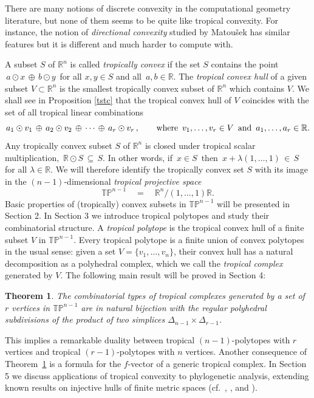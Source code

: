 \documentclass[11pt]{amsart}
\newtheorem{thm}{Theorem}
\newcommand{\RR}{\mathbb{R}}
\newcommand{\TP}{\mathbb{TP}}
\begin{document}
There are many notions of discrete convexity in
the computational geometry literature, but none of them
seems to be quite like tropical convexity. For instance,
the notion of \emph{directional convexity} studied by
Matou\v sek \cite{Mat} has similar features
but it is different and much harder to compute with.

A subset  $S$ of $ \RR^n$ is called
\emph{tropically convex} if
the set $S$ contains the point
$\,a \odot x \,\oplus \, b \odot y \,$
 for all $x,y\in S$ and all $ \, a,b\in \RR $.
The \emph{tropical convex hull} of a given subset $V \subset \RR^n$ is the
smallest tropically convex subset of $\RR^n$ which contains $V$.
We shall see in Proposition \ref{tstc}
that the tropical convex hull of $V$
coincides with the
set of all tropical linear combinations
\begin{equation}
\label{alltropcomb}
  a_1 \odot v_1 \,\oplus \,
a_2 \odot v_2 \,\oplus \, \cdots \,\oplus \, a_r \odot v_r \, ,
\qquad \hbox{where} \,\,\, v_1,\ldots,v_r \in V \,\,\,
\hbox{and} \,\,\, a_1,\ldots,a_r \in \RR.
\end{equation}
Any tropically convex subset $S$ of  $\RR^n$ is
closed under tropical scalar multiplication,
$\, \RR \odot S \, \subseteq \,S$. In other words,
if $\, x \in S \,$ then
$\, x + \lambda (1,\ldots,1) \, \in \,S \,$
for all $\lambda \in \RR$.
We will therefore identify the tropically convex set $S$
with its image in the
$(n-1)$-dimensional  \emph{tropical projective space}
$$\TP^{n-1} \quad = \quad \RR^n/(1,\ldots,1)\RR . $$
Basic properties of (tropically) convex subsets in $\TP^{n-1}$
will be presented in Section 2.
In Section 3 we introduce tropical polytopes
and study their combinatorial structure.
 A \emph{tropical polytope} is the tropical convex hull
of a finite subset $V$ in $\TP^{n-1}$.
Every tropical polytope is a finite union of
convex polytopes in the usual sense: given a set $V=\{v_1,\ldots,v_n\}$, their convex hull has a natural 
decomposition as a polyhedral complex, which we call the \emph{tropical complex} generated by $V$.
The following  main result will be proved in Section 4:

\begin{thm} \label{main}
The combinatorial types of tropical complexes generated by a set of 
$r$ vertices in $\TP^{n-1}$ are in natural bijection with the
regular polyhedral subdivisions of the
product of two simplices $\Delta_{n-1} \times \Delta_{r-1}$.
\end{thm}

This implies a remarkable duality between
tropical $(n-1)$-polytopes with $r$ vertices and
tropical $(r-1)$-polytopes with $n$ vertices.  Another consequence
of Theorem~\ref{main} is a formula for the $f$-vector of a generic tropical complex.
In Section 5 we discuss applications of
tropical convexity to phylogenetic analysis,
extending known results on injective hulls of 
finite metric spaces
(cf.~\cite{DHM}, \cite{DMT}, \cite{DT} and \cite{SS}).
\end{document}
